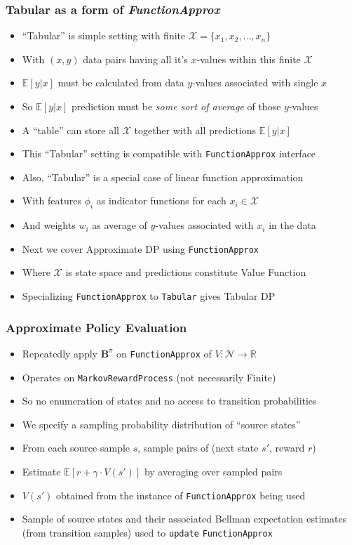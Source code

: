 \documentclass{beamer}
\begin{document}
\begin{frame}
\frametitle{Tabular as a form of {\em FunctionApprox}}
\pause
\begin{itemize}[<+->]
\item ``Tabular'' is simple setting with finite $\mathcal{X} = \{x_1, x_2, \ldots, x_n\}$
\item With $(x,y)$ data pairs having all it's $x$-values within this finite $\mathcal{X}$
\item $\mathbb{E}[y|x]$ must be calculated from data $y$-values associated with single $x$
\item So $\mathbb{E}[y|x]$ prediction must be {\em some sort of average} of those $y$-values
\item A ``table'' can store all $\mathcal{X}$ together with all predictions $\mathbb{E}[y|x]$
\item This ``Tabular'' setting is compatible with \lstinline{FunctionApprox} interface
\item Also, ``Tabular'' is a special case of linear function approximation
\item With features $\phi_i$ as indicator functions for each $x_i \in \mathcal{X}$
\item And weights $w_i$ as average of $y$-values associated with $x_i$ in the data
\item Next we cover Approximate DP using \lstinline{FunctionApprox}
\item Where $\mathcal{X}$ is state space and predictions constitute Value Function
\item Specializing \lstinline{FunctionApprox} to \lstinline{Tabular} gives Tabular DP
\end{itemize}
\end{frame}


\begin{frame}
\frametitle{Approximate Policy Evaluation}
\pause
\begin{itemize}[<+->]
\item Repeatedly apply $\bm{B}^{\pi}$ on \lstinline{FunctionApprox} of $V: \mathcal{N} \rightarrow \mathbb{R}$	
\item Operates on \lstinline{MarkovRewardProcess} (not necessarily Finite)
\item So no enumeration of states and no access to transition probabilities
\item We specify a sampling probability distribution of ``source states''
\item From each source sample $s$, sample pairs of (next state $s'$, reward $r$)
\item Estimate $\mathbb{E}[r + \gamma \cdot V(s')]$ by averaging over sampled pairs
\item  $V(s')$ obtained from the instance of \lstinline{FunctionApprox} being used
\item Sample of source states and their associated Bellman expectation estimates (from transition samples) used to \lstinline{update} \lstinline{FunctionApprox}
\end{itemize}
\end{frame}
\end{document}
